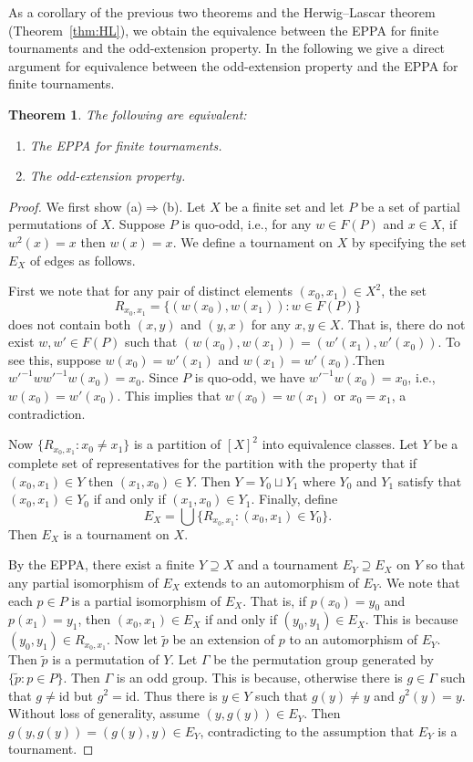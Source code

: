 \documentclass[11pt]{amsart}
\newtheorem{theorem}{Theorem}[section]
\theoremstyle{definition}
\theoremstyle{definition}
\numberwithin{equation}{section}
\begin{document}
As a corollary of the previous two theorems and the Herwig--Lascar theorem (Theorem~\ref{thm:HL}), we obtain the equivalence between the EPPA for finite tournaments and the odd-extension property. In the following we give a direct argument for equivalence between the odd-extension property and the EPPA for finite tournaments.

\begin{theorem}\label{thm:EPPAtoOEP} The following are equivalent:
\begin{enumerate}
\item[(a)] The EPPA for finite tournaments. 
\item[(b)] The odd-extension property.
\end{enumerate}
\end{theorem}

\begin{proof} We first show (a)$\Rightarrow$(b). Let $X$ be a finite set and let $P$ be a set of partial permutations of $X$. Suppose $P$ is quo-odd, i.e., for any $w\in F(P)$ and $x\in X$, if $w^2(x)=x$ then $w(x)=x$. We define a tournament on $X$ by specifying the set $E_X$ of edges as follows.

First we note that for any pair of distinct elements $(x_0,x_1)\in X^2$, the set
$$ R_{x_0, x_1}=\{(w(x_0), w(x_1))\colon w\in F(P)\} $$
does not contain both $(x,y)$ and $(y,x)$ for any $x,y\in X$. That is, there do not exist $w, w'\in F(P)$ such that $(w(x_0), w(x_1))=(w'(x_1), w'(x_0))$. To see this, suppose $w(x_0)=w'(x_1)$ and $w(x_1)=w'(x_0)$.Then $w'^{-1}ww'^{-1}w(x_0)=x_0$. Since $P$ is quo-odd, we have $w'^{-1}w(x_0)=x_0$, i.e., $w(x_0)=w'(x_0)$. This implies that $w(x_0)=w(x_1)$ or $x_0=x_1$, a contradiction. 

Now $\{R_{x_0, x_1}\colon x_0\neq x_1\}$ is a partition of $[X]^2$ into equivalence classes. Let $Y$ be a complete set of representatives for the partition with the property that if $(x_0,x_1)\in Y$ then $(x_1, x_0)\in Y$. Then $Y=Y_0\sqcup Y_1$ where  $Y_0$ and $Y_1$ satisfy that $(x_0,x_1)\in Y_0$ if and only if $(x_1,x_0)\in Y_1$. Finally, define 
$$ E_X=\bigcup\{ R_{x_0,x_1}\colon (x_0, x_1)\in Y_0\}. $$
Then $E_X$ is a tournament on $X$.

By the EPPA, there exist a finite $Y\supseteq X$ and a tournament $E_Y\supseteq E_X$ on $Y$ so that any partial isomorphism of $E_X$ extends to an automorphism of $E_Y$. We note that each $p\in P$ is a partial isomorphism of $E_X$. That is, if $p(x_0)=y_0$ and $p(x_1)=y_1$, then $(x_0, x_1)\in E_X$ if and only if $(y_0, y_1)\in E_X$. This is because $(y_0, y_1)\in R_{x_0, x_1}$. Now let $\tilde{p}$ be an extension of $p$ to an automorphism of $E_Y$. Then $\tilde{p}$ is a permutation of $Y$. Let $\Gamma$ be the permutation group generated by $\{\tilde{p}\colon p\in P\}$. Then $\Gamma$ is an odd group. This is because, otherwise there is $g\in \Gamma$ such that $g\neq \mbox{id}$ but $g^2=\mbox{id}$. Thus there is $y\in Y$ such that $g(y)\neq y$ and $g^2(y)=y$. Without loss of generality, assume $(y, g(y))\in E_Y$. Then $g(y, g(y))=(g(y), y)\in E_Y$, contradicting to the assumption that $E_Y$ is a tournament. 


\end{proof}
\end{document}
